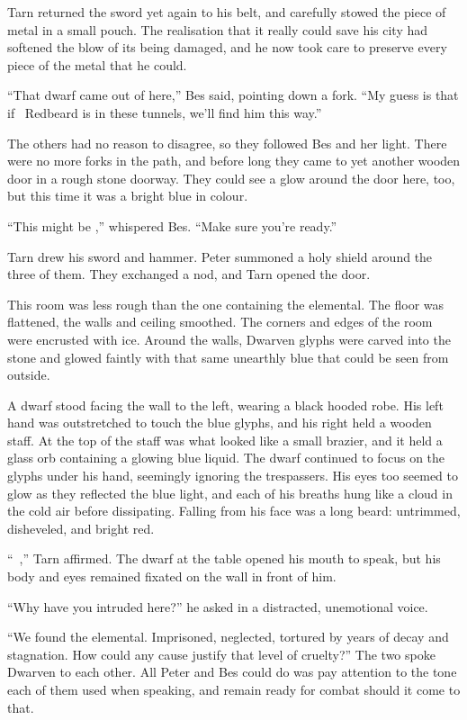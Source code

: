 Tarn returned the sword yet again to his belt, and carefully stowed the piece of metal in a small pouch.  The realisation that it really could save his city had softened the blow of its being damaged, and he now took care to preserve every piece of the metal that he could.

``That dwarf came out of here,'' Bes said, pointing down a fork.  ``My guess is that if \mothzam\ Redbeard is in these tunnels, we'll find him this way.''

The others had no reason to disagree, so they followed Bes and her light.  There were no more forks in the path, and before long they came to yet another wooden door in a rough stone doorway.  They could see a glow around the door here, too, but this time it was a bright blue in colour.

``This might be \mothzam,'' whispered Bes.  ``Make sure you're ready.''

Tarn drew his sword and hammer.  Peter summoned a holy shield around the three of them.  They exchanged a nod, and Tarn opened the door.

This room was less rough than the one containing the elemental.  The floor was flattened, the walls and ceiling smoothed.  The corners and edges of the room were encrusted with ice.  Around the walls, Dwarven glyphs were carved into the stone and glowed faintly with that same unearthly blue that could be seen from outside.

A dwarf stood facing the wall to the left, wearing a black hooded robe.  His left hand was outstretched to touch the blue glyphs, and his right held a wooden staff.  At the top of the staff was what looked like a small brazier, and it held a glass orb containing a glowing blue liquid.  The dwarf continued to focus on the glyphs under his hand, seemingly ignoring the trespassers.  His eyes too seemed to glow as they reflected the blue light, and each of his breaths hung like a cloud in the cold air before dissipating.  Falling from his face was a long beard: untrimmed, disheveled, and bright red.

``\mothzam\ \driktur,'' Tarn affirmed.  The dwarf at the table opened his mouth to speak, but his body and eyes remained fixated on the wall in front of him.

``Why have you intruded here?'' he asked in a distracted, unemotional voice.

``We found the elemental.  Imprisoned, neglected, tortured by years of decay and stagnation.  How could any cause justify that level of cruelty?''  The two spoke Dwarven to each other.  All Peter and Bes could do was pay attention to the tone each of them used when speaking, and remain ready for combat should it come to that.


